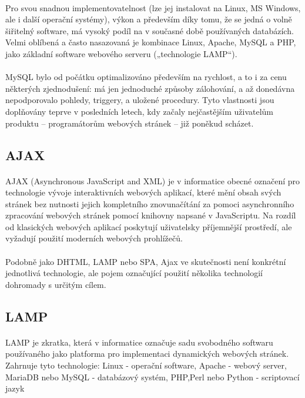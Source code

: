 \paragraph{}
Pro svou snadnou implementovatelnost (lze jej instalovat na Linux, MS Windows, ale i další operační systémy), výkon a především díky tomu, že se jedná o volně šiřitelný software, má vysoký podíl na v současné době používaných databázích. Velmi oblíbená a často nasazovaná je kombinace Linux, Apache, MySQL a PHP, jako základní software webového serveru („technologie LAMP“).
\paragraph{}
MySQL bylo od počátku optimalizováno především na rychlost, a to i za cenu některých zjednodušení: má jen jednoduché způsoby zálohování, a až donedávna nepodporovalo pohledy, triggery, a uložené procedury. Tyto vlastnosti jsou doplňovány teprve v posledních letech, kdy začaly nejčastějším uživatelům produktu – programátorům webových stránek – již poněkud scházet.


\subsection{AJAX}
\paragraph{}
AJAX (Asynchronous JavaScript and XML) je v informatice obecné označení pro technologie vývoje interaktivních webových aplikací, které mění obsah svých stránek bez nutnosti jejich kompletního znovunačítání za pomoci asynchronního zpracování webových stránek pomocí knihovny napsané v JavaScriptu. Na rozdíl od klasických webových aplikací poskytují uživatelsky příjemnější prostředí, ale vyžadují použití moderních webových prohlížečů.
\paragraph{}
Podobně jako DHTML, LAMP nebo SPA, Ajax ve skutečnosti není konkrétní jednotlivá technologie, ale pojem označující použití několika technologií dohromady s určitým cílem.
\subsection{LAMP}
\paragraph{}
LAMP je zkratka, která v informatice označuje sadu svobodného softwaru používaného jako platforma pro implementaci dynamických webových stránek. Zahrnuje tyto technologie: Linux - operační software, Apache - webový server,  MariaDB nebo MySQL - databázový systém, PHP,Perl nebo Python - scriptovací jazyk
